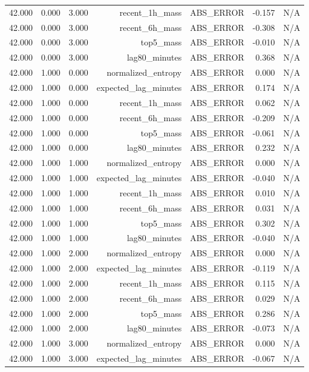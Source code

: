 \begin{table}[h!]
\begin{tabular}{lrrrrrr}
42.000 & 0.000 & 3.000 & recent\_1h\_mass & ABS\_ERROR & -0.157 & N/A \\
42.000 & 0.000 & 3.000 & recent\_6h\_mass & ABS\_ERROR & -0.308 & N/A \\
42.000 & 0.000 & 3.000 & top5\_mass & ABS\_ERROR & -0.010 & N/A \\
42.000 & 0.000 & 3.000 & lag80\_minutes & ABS\_ERROR & 0.368 & N/A \\
42.000 & 1.000 & 0.000 & normalized\_entropy & ABS\_ERROR & 0.000 & N/A \\
42.000 & 1.000 & 0.000 & expected\_lag\_minutes & ABS\_ERROR & 0.174 & N/A \\
42.000 & 1.000 & 0.000 & recent\_1h\_mass & ABS\_ERROR & 0.062 & N/A \\
42.000 & 1.000 & 0.000 & recent\_6h\_mass & ABS\_ERROR & -0.209 & N/A \\
42.000 & 1.000 & 0.000 & top5\_mass & ABS\_ERROR & -0.061 & N/A \\
42.000 & 1.000 & 0.000 & lag80\_minutes & ABS\_ERROR & 0.232 & N/A \\
42.000 & 1.000 & 1.000 & normalized\_entropy & ABS\_ERROR & 0.000 & N/A \\
42.000 & 1.000 & 1.000 & expected\_lag\_minutes & ABS\_ERROR & -0.040 & N/A \\
42.000 & 1.000 & 1.000 & recent\_1h\_mass & ABS\_ERROR & 0.010 & N/A \\
42.000 & 1.000 & 1.000 & recent\_6h\_mass & ABS\_ERROR & 0.031 & N/A \\
42.000 & 1.000 & 1.000 & top5\_mass & ABS\_ERROR & 0.302 & N/A \\
42.000 & 1.000 & 1.000 & lag80\_minutes & ABS\_ERROR & -0.040 & N/A \\
42.000 & 1.000 & 2.000 & normalized\_entropy & ABS\_ERROR & 0.000 & N/A \\
42.000 & 1.000 & 2.000 & expected\_lag\_minutes & ABS\_ERROR & -0.119 & N/A \\
42.000 & 1.000 & 2.000 & recent\_1h\_mass & ABS\_ERROR & 0.115 & N/A \\
42.000 & 1.000 & 2.000 & recent\_6h\_mass & ABS\_ERROR & 0.029 & N/A \\
42.000 & 1.000 & 2.000 & top5\_mass & ABS\_ERROR & 0.286 & N/A \\
42.000 & 1.000 & 2.000 & lag80\_minutes & ABS\_ERROR & -0.073 & N/A \\
42.000 & 1.000 & 3.000 & normalized\_entropy & ABS\_ERROR & 0.000 & N/A \\
42.000 & 1.000 & 3.000 & expected\_lag\_minutes & ABS\_ERROR & -0.067 & N/A \\

\end{tabular}
\end{table}
